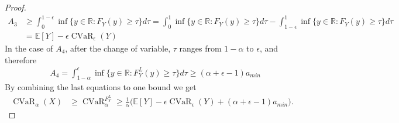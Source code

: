 \documentclass[acmlarge, manuscript, screen, review, natbib=false, oneside]{acmart}
\DeclareMathOperator{\CVaR}{CVaR}
\begin{document}
\begin{proof}
	\begin{equation}
		\begin{aligned}
			A_3 &\geq \int_{0}^{1-\epsilon} \inf \{y\in \mathbb{R}:F_Y(y)\geq \tau\} d\tau 
			=\int_{0}^{1} \inf \{y\in \mathbb{R}:F_Y(y)\geq \tau\} d\tau 
			-\int_{1-\epsilon}^{1} \inf \{y\in \mathbb{R}:F_Y(y)\geq \tau\} d\tau \\
			&=\mathbb{E}[Y] - \epsilon \CVaR_\epsilon(Y)
		\end{aligned}
	\end{equation}
	In the case of $A_4$, after the change of variable, $\tau$ ranges from $1-\alpha$ to $\epsilon$, and therefore 
	\begin{equation}
		\begin{aligned}
			&A_4=\int_{1-\alpha}^{\epsilon} \inf \{y\in \mathbb{R}:F_Y^L(y)\geq \tau\} d\tau \geq (\alpha+\epsilon-1)a_{min}
		\end{aligned}
	\end{equation}
	By combining the last equations to one bound we get \begin{equation}
		\begin{aligned}
			\CVaR_\alpha(X)&\geq \CVaR_\alpha^{F_Y^L}
			\geq \frac{1}{\alpha}\big(\mathbb{E}[Y] - \epsilon \CVaR_\epsilon(Y) + (\alpha+\epsilon-1)a_{min}\big).
		\end{aligned}
	\end{equation}
\end{proof}
\end{document}
